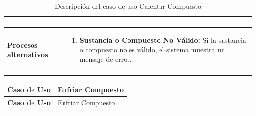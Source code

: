 \begin{longtable}{>{\raggedright\arraybackslash}m{} >{\raggedright\arraybackslash}m{}}
\begin{enumerate}
    \end{enumerate} \\
    \midrule
    \textbf{Procesos alternativos} & 
    \begin{enumerate}[{2}A. ]
        \item \textbf{Sustancia o Compuesto No Válido:} Si la sustancia o compuesto no es válido, el sistema muestra un mensaje de error.     
    \end{enumerate}\\
    \midrule
    \caption{Descripción del caso de uso Calentar Compuesto}
    \label{tab:Caso_de_uso_ Balancear_Calentar_Compuesto}
\end{longtable}

\begin{longtable}{>{\raggedright\arraybackslash}m{} >{\raggedright\arraybackslash}m{}}
    \toprule\toprule
    \textbf{Caso de Uso} &   Enfriar Compuesto \\
    \midrule\midrule
    \endfirsthead

    \toprule\toprule
    \textbf{Caso de Uso} &   Enfriar Compuesto \\
    \midrule\midrule
    \endhead


    \endfoot


\end{longtable}
